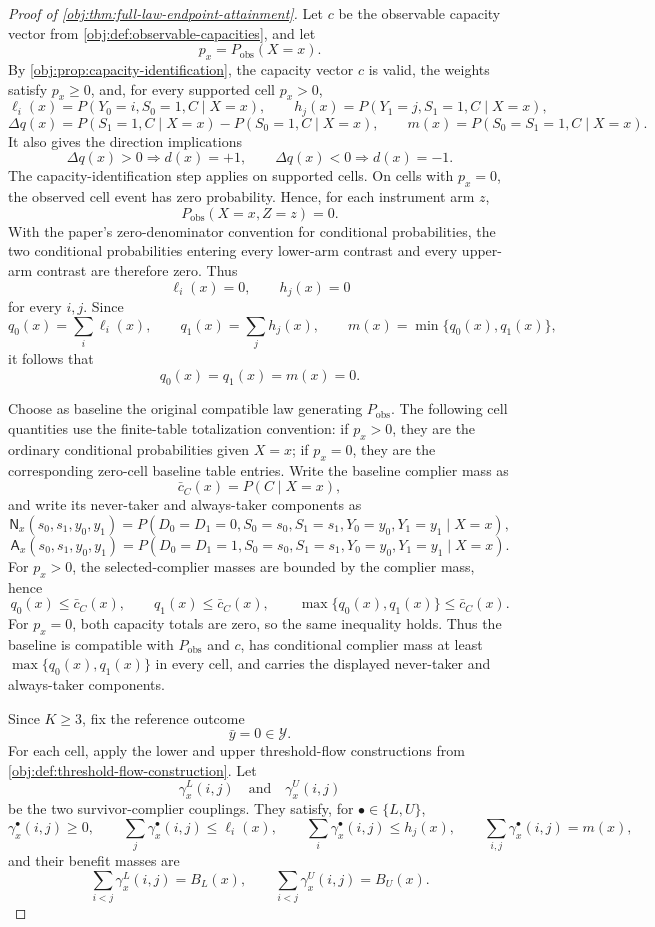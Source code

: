 \documentclass[11pt]{article}
\begin{document}
\begin{proof}[Proof of \cref{obj:thm:full-law-endpoint-attainment}]
Let \(c\) be the observable capacity vector from \cref{obj:def:observable-capacities}, and let
\[
p_x=P_{\mathrm{obs}}(X=x).
\]
By \cref{obj:prop:capacity-identification}, the capacity vector \(c\) is valid, the weights satisfy \(p_x\ge 0\), and, for every supported cell \(p_x>0\),
\[
\ell_i(x)=P(Y_0=i,S_0=1,C\mid X=x),
\qquad
h_j(x)=P(Y_1=j,S_1=1,C\mid X=x),
\]
\[
\Delta q(x)=P(S_1=1,C\mid X=x)-P(S_0=1,C\mid X=x),
\qquad
m(x)=P(S_0=S_1=1,C\mid X=x).
\]
It also gives the direction implications
\[
\Delta q(x)>0\Rightarrow d(x)=+1,
\qquad
\Delta q(x)<0\Rightarrow d(x)=-1.
\]
The capacity-identification step applies on supported cells.  On cells with \(p_x=0\), the observed cell event has zero probability.  Hence, for each instrument arm \(z\),
\[
P_{\mathrm{obs}}(X=x,Z=z)=0.
\]
With the paper's zero-denominator convention for conditional probabilities, the two conditional probabilities entering every lower-arm contrast and every upper-arm contrast are therefore zero.  Thus
\[
\ell_i(x)=0,\qquad h_j(x)=0
\]
for every \(i,j\).  Since
\[
q_0(x)=\sum_i\ell_i(x),\qquad
q_1(x)=\sum_j h_j(x),
\qquad
m(x)=\min\{q_0(x),q_1(x)\},
\]
it follows that
\[
q_0(x)=q_1(x)=m(x)=0.
\]

Choose as baseline the original compatible law generating \(P_{\mathrm{obs}}\).  The following cell quantities use the finite-table totalization convention: if \(p_x>0\), they are the ordinary conditional probabilities given \(X=x\); if \(p_x=0\), they are the corresponding zero-cell baseline table entries.  Write the baseline complier mass as
\[
\bar c_C(x)=P(C\mid X=x),
\]
and write its never-taker and always-taker components as
\[
\mathsf N_x(s_0,s_1,y_0,y_1)
=
P(D_0=D_1=0,S_0=s_0,S_1=s_1,Y_0=y_0,Y_1=y_1\mid X=x),
\]
\[
\mathsf A_x(s_0,s_1,y_0,y_1)
=
P(D_0=D_1=1,S_0=s_0,S_1=s_1,Y_0=y_0,Y_1=y_1\mid X=x).
\]
For \(p_x>0\), the selected-complier masses are bounded by the complier mass, hence
\[
q_0(x)\le \bar c_C(x),
\qquad
q_1(x)\le \bar c_C(x),
\qquad
\max\{q_0(x),q_1(x)\}\le \bar c_C(x).
\]
For \(p_x=0\), both capacity totals are zero, so the same inequality holds.  Thus the baseline is compatible with \(P_{\mathrm{obs}}\) and \(c\), has conditional complier mass at least \(\max\{q_0(x),q_1(x)\}\) in every cell, and carries the displayed never-taker and always-taker components. %

Since \(K\ge 3\), fix the reference outcome
\[
\bar y=0\in\mathcal Y.
\]
For each cell, apply the lower and upper threshold-flow constructions from \cref{obj:def:threshold-flow-construction}.  Let
\[
\gamma^L_x(i,j)
\quad\text{and}\quad
\gamma^U_x(i,j)
\]
be the two survivor-complier couplings.  They satisfy, for \(\bullet\in\{L,U\}\),
\[
\gamma^\bullet_x(i,j)\ge 0,\qquad
\sum_j\gamma^\bullet_x(i,j)\le \ell_i(x),\qquad
\sum_i\gamma^\bullet_x(i,j)\le h_j(x),\qquad
\sum_{i,j}\gamma^\bullet_x(i,j)=m(x),
\]
and their benefit masses are
\[
\sum_{i<j}\gamma^L_x(i,j)=B_L(x),
\qquad
\sum_{i<j}\gamma^U_x(i,j)=B_U(x).
\]


\end{proof}
\end{document}
